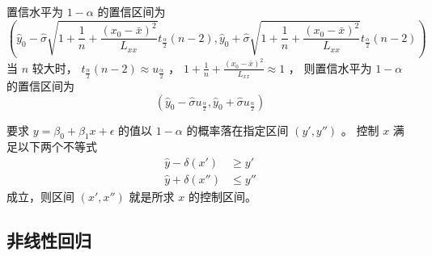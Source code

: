  置信水平为 $ 1- \alpha $ 的置信区间为
\begin{equation}
    \left(
        \hat{y}_0 - \hat{\sigma}\sqrt{1 + \frac{1}{n} + \frac{(x_0 - \bar{x})^2}{L_{xx}}} t_{\frac{\alpha}{2}}(n-2),
        \hat{y}_0 + \hat{\sigma}\sqrt{1 + \frac{1}{n} + \frac{(x_0 - \bar{x})^2}{L_{xx}}} t_{\frac{\alpha}{2}}(n-2)
    \right)
\end{equation}
当 $ n $ 较大时， $ t_{\frac{\alpha}{2}}(n-2) \approx u_{\frac{\alpha}{2}} $ ，
$ 1 + \frac{1}{n} + \frac{(x_0 - \bar{x})^2}{L_{xx}} \approx 1 $ ，
则置信水平为 $ 1- \alpha $ 的置信区间为 
\begin{equation}
    \left(
        \hat{y}_0 - \hat{\sigma}u_{\frac{\alpha}{2}},
        \hat{y}_0 + \hat{\sigma}u_{\frac{\alpha}{2}}
    \right)
\end{equation}

 要求 $ y = \beta_0 + \beta_1 x + \epsilon $ 的值以 $ 1 - \alpha $ 的概率落在指定区间 $ (y', y'') $ 。
控制 $ x $ 满足以下两个不等式
\begin{align}
    \hat{y} - \delta(x') & \geqslant y' \\
    \hat{y} + \delta(x'') & \leqslant y''
\end{align}
成立，则区间 $ (x', x'') $ 就是所求 $ x $ 的控制区间。

\subsection{非线性回归}

